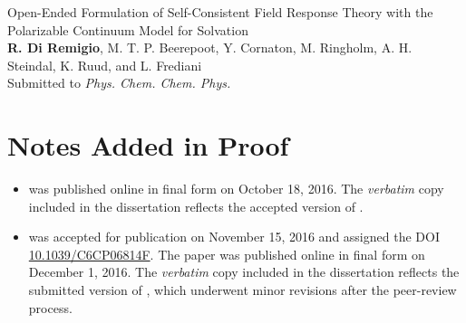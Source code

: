 \begin{description}[leftmargin=2mm, style=nextline]
\item[\paper{V}]
  {\small\textsf{
  Open-Ended Formulation of Self-Consistent Field Response Theory with
  the Polarizable Continuum Model for Solvation
  }
  \\
  \textbf{R. Di Remigio}, M. T. P. Beerepoot, Y. Cornaton, M. Ringholm,
  A. H. Steindal, K. Ruud, and L. Frediani
  \\
  Submitted to \textit{Phys. Chem. Chem. Phys.}
  }
\label{pcmopenrsp}
\end{description}
\renewcommand{\descriptionlabel}[1]{\hspace*{\labelsep}\spacedlowsmallcaps{#1}}

\section*{Notes Added in Proof}

\begin{itemize}
\item {} was published online in final form on October 18, 2016.
  The \emph{verbatim} copy included in the dissertation reflects the
  accepted version of .
\item {} was accepted for publication on November 15, 2016 and
  assigned the DOI \url{10.1039/C6CP06814F}.
  The paper was published online in final form on December 1, 2016.
  The \emph{verbatim} copy included in the dissertation reflects the
  submitted version of , which underwent minor revisions after
  the peer-review process.
\end{itemize}
